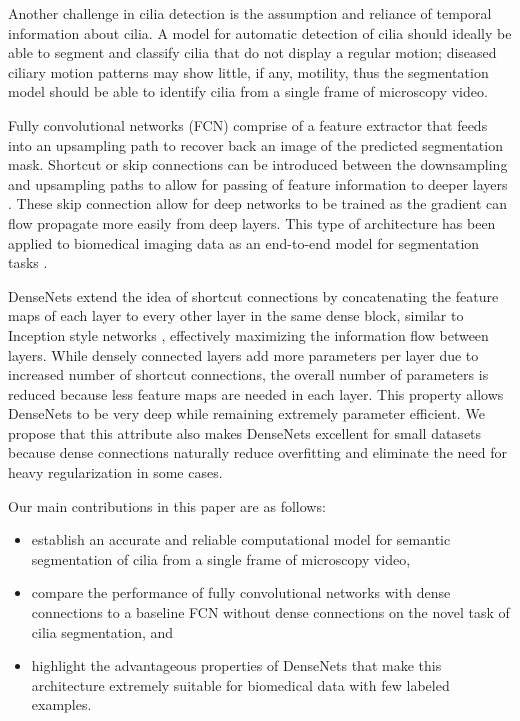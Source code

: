 \documentclass{llncs}
\begin{document}
\par
Another challenge in cilia detection is the assumption and reliance of temporal information about cilia. A model for automatic detection of cilia should ideally be able to segment and classify cilia that do not display a regular motion; diseased ciliary motion patterns may show little, if any, motility, thus the segmentation model should be able to identify cilia from a single frame of microscopy video.
\par 
Fully convolutional networks (FCN) \cite{FCN} comprise of a feature extractor that feeds into an upsampling path to recover back an image of the predicted segmentation mask. Shortcut or skip connections can be introduced between the downsampling and upsampling paths to allow for passing of feature information to deeper layers \cite{Highway}. These skip connection allow for deep networks to be trained as the gradient can flow propagate more easily from deep layers. This type of architecture has been applied to biomedical imaging data as an end-to-end model for segmentation tasks \cite{U-Net}.
\par
DenseNets \cite{DenseNet} extend the idea of shortcut connections by concatenating the feature maps of each layer to every other layer in the same dense block, similar to Inception style networks \cite{Inception}, effectively maximizing the information flow between layers. While densely connected layers add more parameters per layer due to increased number of shortcut connections, the overall number of parameters is reduced because less feature maps are needed in each layer. This property allows DenseNets to be very deep while remaining extremely parameter efficient. We propose that this attribute also makes DenseNets excellent for small datasets because dense connections naturally reduce overfitting and eliminate the need for heavy regularization in some cases.    
\par
Our main contributions in this paper are as follows:
\begin{itemize}
\item establish an accurate and reliable computational model for semantic segmentation of cilia from a single frame of microscopy video,
\item compare the performance of fully convolutional networks with dense connections to a baseline FCN without dense connections on the novel task of cilia segmentation, and 
\item highlight the advantageous properties of DenseNets that make this architecture extremely suitable for biomedical data with few labeled examples.  
\end{itemize}
\end{document}
